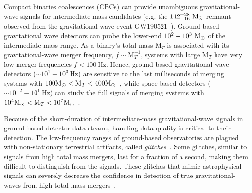 \documentclass[%
 nofootinbib,
 amsmath,amssymb,
 aps,
 twocolumn,
 superscriptaddress
]{revtex4-2}
\newcommand{\mathcmd}[1]{{\sc \relax\ifmmode#1\else $#1$\fi}\xspace}
\newcommand{\msun}{\mathcmd{\text{M}_\odot}}
\begin{document}
Compact binaries coalescences (CBCs) can provide unambiguous gravitational-wave signals for intermediate-mass candidates (e.g. the $142^{+28}_{-16}\ \msun$ remnant observed from the gravitational wave event GW190521~\cite{Abbott:2020:PhRvL}). Ground-based gravitational wave detectors can probe the lower-end $10^{2} - 10^{3}\ \msun$ of the intermediate mass range. 
 As a binary's total mass $\text{M}_{T}$ is associated with its gravitational-wave merger frequency, $f\sim \text{M}_{T}^{-1}$, systems with large $\text{M}_{T}$ have very low merger frequencies $f < 100\ \text{Hz}$. Hence, ground based gravitational wave detectors ($\sim 10^1 - 10^3\ \text{Hz}$) are sensitive to the last milliseconds of merging systems with $100 \msun < \text{M}_{T} < 400 \msun$~\cite{LIGOScientificCollaboration:2015:CQGra, Martynov:2016:PhRvD, Moore_2014}, while space-based detectors ($\sim 10^{-2} - 10^1\ \text{Hz}$) can study the full signals of merging systems with $10^4 \msun < \text{M}_{T} < 10^7 \msun$~\cite{ Moore_2014, Lu:2019:PhRvD}. 

Because of the short-duration of intermediate-mass gravitational-wave signals in ground-based detector data steams, handling data quality is critical to their detection. The low-frequency ranges of ground-based observatories are plagued with non-stationary terrestrial artifacts, called \textit{glitches}~\cite{ pycbc_short_duration_transients, pe_with_glitch, blip_glitches}. Some glitches, similar to signals from high total mass mergers, last for a fraction of a second, making them difficult to distinguish from the signals. These glitches that mimic astrophysical signals can severely decrease the confidence in detection of true gravitational-waves from high total mass mergers~\cite{pycbc_short_duration_transients}.
\end{document}
